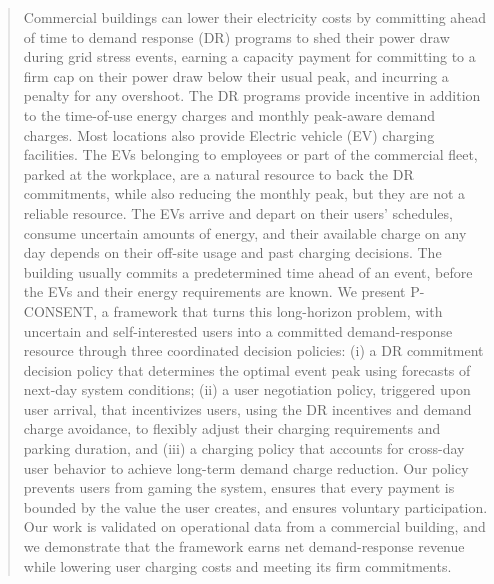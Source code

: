 \begin{abstract}

Commercial buildings can lower their electricity costs by committing ahead of time to demand response (DR) programs to shed their power draw during grid stress events, earning a capacity payment for committing to a firm cap on their power draw below their usual peak, and incurring a penalty for any overshoot. The DR programs provide incentive in addition to the time-of-use energy charges and monthly peak-aware demand charges. Most locations also provide Electric vehicle (EV) charging facilities. The EVs belonging to employees or part of the commercial fleet, parked at the workplace, are a natural resource to back the DR commitments, while also reducing the monthly peak, but they are not a reliable resource. The EVs arrive and depart on their users' schedules, consume uncertain amounts of energy, and their available charge on any day depends on their off-site usage and past charging decisions. The building usually commits a predetermined time ahead of an event, before the EVs and their energy requirements are known. We present P-CONSENT, a framework that turns this long-horizon problem, with uncertain and self-interested users into a committed demand-response resource through three coordinated decision policies: (i) a DR commitment decision policy that determines the optimal event peak using forecasts of next-day system conditions; (ii) a user negotiation policy, triggered upon user arrival, that incentivizes users, using the DR incentives and demand charge avoidance, to flexibly adjust their charging requirements and parking duration, and (iii) a charging policy that accounts for cross-day user behavior to achieve long-term demand charge reduction. Our policy prevents users from gaming the system, ensures that every payment is bounded by the value the user creates, and ensures voluntary participation. Our work is validated on operational data from a commercial building, and we demonstrate that the framework earns net demand-response revenue while lowering user charging costs and meeting its firm commitments.
\end{abstract}
